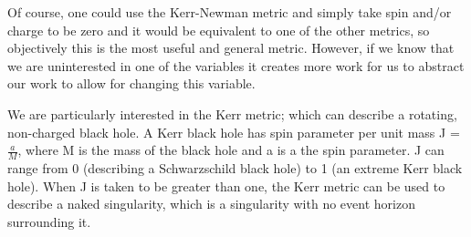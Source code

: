 \documentclass[landscape,a2paper,fontscale=1]{baposter} %
\begin{document}
\begin{poster}
{\vspace{1em}
Of course, one could use the  Kerr-Newman metric and simply take spin and/or charge to be zero and it would be equivalent to one of the other metrics, so objectively this is the most useful and general metric. However, if we know that we are uninterested in one of the variables it creates more work for us to abstract our work to allow for changing this variable.

\vspace{1em}
We are particularly interested in the Kerr metric; which can describe a rotating, non-charged black hole. A Kerr black hole has spin parameter per unit mass J = $\frac{a}{M}$, where M is the mass of the black hole and a is a the spin parameter. J can range from 0 (describing a Schwarzschild black hole) to 1 (an extreme Kerr black hole). When J is taken to be greater than one, the Kerr metric can be used to describe a naked singularity, which is a singularity with no event horizon surrounding it.
}


\end{poster}
\end{document}
